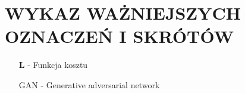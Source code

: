 \section*{WYKAZ WAŻNIEJSZYCH OZNACZEŃ I SKRÓTÓW}  

  \bigskip

  \begin{itemize}
    \item[$\mathbf{L}$] - Funkcja kosztu
    \item[GAN] - Generative adversarial network
  \end{itemize}
